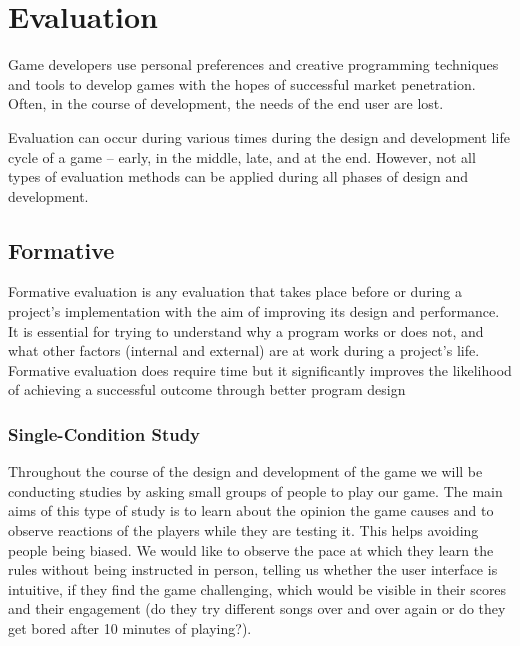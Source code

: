 
\chapter{Evaluation} %

\label{Chapter6} %



Game developers use personal preferences and creative programming techniques and tools to develop games with the hopes of successful market penetration. Often, in the course of development, the needs of the end user are lost. 

Evaluation can occur during various times during the design and development life cycle of a game – early, in the middle, late, and at the end. However, not all types of evaluation methods can be applied during all phases of design and development.

\section{Formative}

Formative evaluation is any evaluation that takes place before or during a project’s implementation with the aim of improving its design and performance.
It is essential for trying to understand why a program works or does not, and what other factors (internal and external) are at work during a project’s life.
Formative evaluation does require time but it significantly improves the likelihood of achieving a successful outcome through better program design

\subsection{Single-Condition Study}
Throughout the course of the design and development of the game we will be conducting studies by asking small groups of people to play our game. The main aims of this type of study is to learn about the opinion the game causes and to observe reactions of the players while they are testing it. This helps avoiding people being biased. We would like to observe the pace at which they learn the rules without being instructed in person, telling us whether the user interface is intuitive, if they find the game challenging, which would be visible in their scores and their engagement (do they try different songs over and over again or do they get bored after 10 minutes of playing?). 


